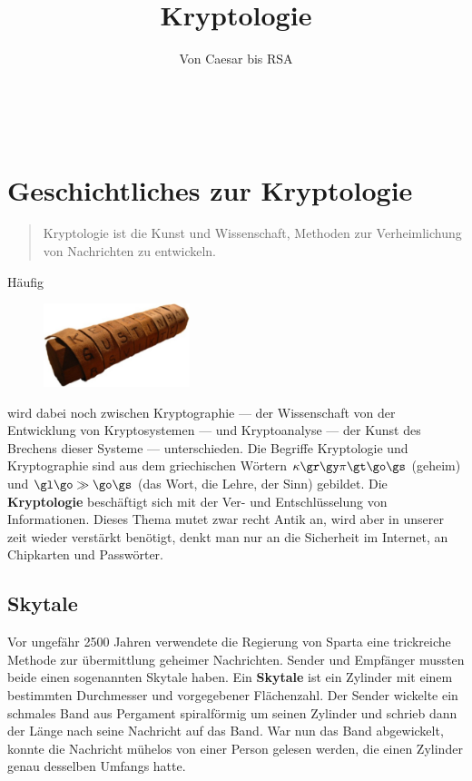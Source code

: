 \documentclass[%
11pt,%
twoside,%
titlepage,%
german,%
headsepline%
]{scrartcl}
\title{Kryptologie}
\subtitle{Von Caesar bis RSA}
\author{}
\date{}
\begin{document}
\maketitle

\newpage\thispagestyle{empty}~
\newpage

\tableofcontents
\cleardoublepage

\section{Geschichtliches zur Kryptologie}
\begin{quote}
Kryptologie ist die Kunst und Wissenschaft, Methoden zur Verheimlichung von Nachrichten zu entwickeln.
\end{quote}

Häufig
\begin{figure}
  \begin{center}
    \includegraphics[width=0.38\textwidth]{pictures/skytale}
  \end{center}
\end{figure}
wird dabei noch zwischen Kryptographie --- der Wissenschaft von der Entwicklung von Kryptosystemen --- und Kryptoanalyse --- der Kunst des Brechens dieser Systeme --- unterschieden. Die Begriffe Kryptologie und Kryptographie sind aus dem griechischen W\"ortern $\kappa\gr\gy\pi\gt\go\gs$ (geheim) und $\gl\go\gg\go\gs$ (das Wort, die Lehre, der Sinn) gebildet.
Die \textbf{Kryptologie} beschäftigt sich mit der Ver- und Entschlüsselung von Informationen. Dieses Thema mutet zwar recht Antik an, wird aber in unserer zeit wieder verstärkt ben\"otigt, denkt man nur an die Sicherheit im Internet, an Chipkarten und Passw\"orter.

\subsection{Skytale}

Vor ungefähr 2500 Jahren verwendete die Regierung von Sparta eine trickreiche Methode zur übermittlung geheimer Nachrichten. Sender und Empfänger mussten beide einen sogenannten Skytale haben. Ein \textbf{Skytale} ist ein Zylinder mit einem bestimmten Durchmesser und vorgegebener Flächenzahl. Der Sender wickelte ein schmales Band aus Pergament spiralf\"ormig um seinen Zylinder und schrieb dann der Länge nach seine Nachricht auf das Band. War nun das Band abgewickelt, konnte die Nachricht mühelos von einer Person gelesen werden, die einen Zylinder genau desselben Umfangs hatte.
\end{document}
